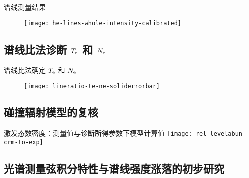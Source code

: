 \begin{frame}{谱线测量结果}
	\centering
  \begin{figure}
      \texttt{[image: he-lines-whole-intensity-calibrated]}
  \end{figure}
\end{frame}

\subsection{谱线比法诊断 $T_{\rm e}$ 和 $N_{\rm e}$}

\begin{frame}{谱线比法确定 $T_{\rm e}$ 和 $N_{\rm e}$}
	\vspace{-0.5em}
	\begin{figure}
      \texttt{[image: lineratio-te-ne-soliderrorbar]}
  \end{figure}
\end{frame}

\subsection{碰撞辐射模型的复核}
\begin{frame}{激发态数密度：测量值与诊断所得参数下模型计算值}
	\centering
	\vspace{-0.5em}
    \texttt{[image: rel\_levelabun-crm-to-exp]}
\end{frame}

\subsection{光谱测量弦积分特性与谱线强度涨落的初步研究}


